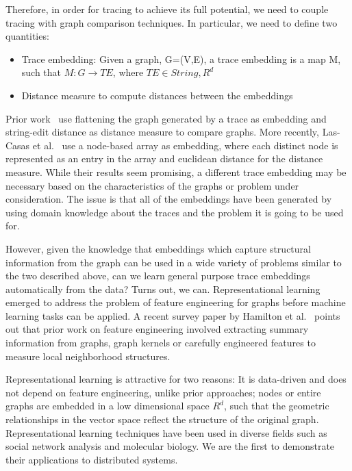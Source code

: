 Therefore, in order for tracing to achieve its full potential, we need to couple tracing with graph comparison techniques. In particular, we need to define two quantities:
\begin{itemize}
\item Trace embedding: \newline
Given a graph, G=(V,E), a trace embedding is a map M, such that \newline
$M\colon G \rightarrow TE$, where $TE \in String, R^{d}$
\item Distance measure to compute distances between the embeddings
\end{itemize}
Prior work~\cite{Barham:2003:MOM:1251054.1251069, Sambasivan:2011:DPC:1972457.1972463} use flattening the graph generated by a trace as embedding and string-edit distance as distance measure to compare graphs. More recently, Las-Casas et al.~\cite{Las-Casas:2018:WSE:3267809.3267841} use a node-based array as embedding, where each distinct node is represented as an entry in the array and euclidean distance for the distance measure. While their results seem promising, a different trace embedding may be necessary based on the characteristics of the graphs or problem under consideration. The issue is that all of the embeddings have been generated by using domain knowledge about the traces and the problem it is going to be used for. 

However, given the knowledge that embeddings which capture structural information from the graph can be used in a wide variety of problems similar to the two described above, can we learn general purpose trace embeddings automatically from the data? Turns out, we can. Representational learning emerged to address the problem of feature engineering for graphs before machine learning tasks can be applied. A recent survey paper by Hamilton et al.~\cite{corr_2017_abs-1709-05584} points out that prior work on feature engineering involved extracting summary information from graphs, graph kernels or carefully engineered features to measure local neighborhood structures. 

Representational learning is attractive for two reasons: It is data-driven and does not depend on feature engineering, unlike prior approaches; nodes or entire graphs are embedded in a low dimensional space $R^{d}$, such that the geometric relationships in the vector space reflect the structure of the original graph. Representational learning techniques have been used in diverse fields such as social network analysis and molecular biology. We are the first to demonstrate their applications to distributed systems. 

